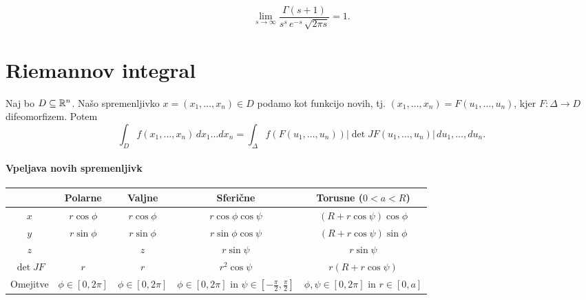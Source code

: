 \begin{izrek}
    \[\lim_{s \to \infty} \frac{\Gamma(s+1)}{s^s \, e^{-s} \, \sqrt{2 \pi s}} = 1.\]
\end{izrek}

\newpage
\section{Riemannov integral}
\begin{izrek}
    Naj bo \(D \subseteq \mathbb{R}^n\). Našo spremenljivko \(x = (x_1, \ldots, x_n) \in D\) podamo kot funkcijo novih, tj. \((x_1, \ldots, x_n) = F(u_1, \ldots, u_n)\), kjer \(F: \Delta \to D\) difeomorfizem.  Potem \[\int_D f(x_1, \ldots, x_n)\, dx_1 \ldots dx_n = \int_\Delta f(F(u_1, \ldots, u_n)) |\det JF(u_1, \ldots, u_n)| \, du_1, \ldots, du_n.\]
\end{izrek}

\paragraph{Vpeljava novih spremenljivk}
\begin{center}
    \begin{tabular}{ c | c | c | c | c }
        & Polarne & Valjne & Sferične & Torusne (\(0 < a < R\)) \\ \hline 
        \(x\) & \(r \cos \phi\) & \(r \cos \phi\) &  \(r \cos \phi \cos \psi\) & \((R + r \cos \psi) \cos \phi\)\\ 
        \(y\) & \(r \sin \phi\) & \(r \sin \phi\) &  \(r \sin \phi \cos \psi\) & \((R + r \cos \psi) \sin \phi \) \\
        \(z\) & & \(z\) & \(r \sin \psi\) & \(r \sin \psi\) \\
        \(\det JF\) & \(r\) & \(r\) & \(r^2 \cos \psi\) & \(r(R+r \cos \psi)\) \\
        Omejitve & \(\phi \in [0, 2 \pi]\) & \(\phi \in [0, 2 \pi]\) & \(\phi \in [0, 2 \pi]\) in \(\psi \in [-\frac{\pi}{2}, \frac{\pi}{2}]\) & \(\phi, \psi \in [0, 2 \pi]\) in \(r \in [0, a]\)
    \end{tabular}
\end{center}

